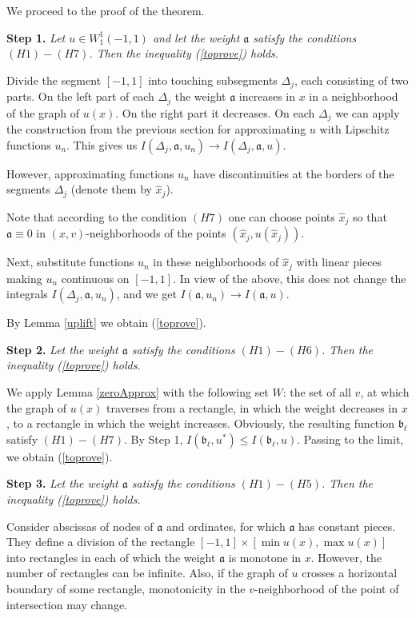 \documentclass[12pt]{article}
\renewcommand{\le}{\leqslant}
\newcommand{\W}{W_1^1}
\begin{document}
We proceed to the proof of the theorem.

\bigskip
{\bf Step 1.} {\it Let $u \in \W(-1, 1)$ and let the weight $\mathfrak a$ satisfy the conditions $(H1)-(H7)$.
Then the inequality (\ref{toprove}) holds.}

Divide the segment $[-1, 1]$ into touching subsegments $\Delta_j$, each consisting of two parts.
On the left part of each $\Delta_j$ the weight $\mathfrak a$ increases in $x$ in a neighborhood
of the graph of $u(x)$. On the right part it decreases.
On each $\Delta_j$ we can apply the construction from the previous section
for approximating $u$ with Lipschitz functions $u_n$.
This gives us $I(\Delta_j, \mathfrak a, u_n) \to I(\Delta_j, \mathfrak a, u)$.

However, approximating functions $u_n$ have discontinuities at the borders of the segments $\Delta_j$
(denote them by $\hat{x}_j$).

Note that according to the condition $(H7)$ one can choose points $\hat{x}_j$ so
that $\mathfrak a \equiv 0$ in $(x, v)$-neighborhoods of the points $(\hat{x}_j, u(\hat{x}_j))$.

Next, substitute functions $u_n$ in these neighborhoods of $\hat{x}_j$ with linear pieces
making $u_n$ continuous on $[-1, 1]$.
In view of the above, this does not change the integrals $I(\Delta_j, \mathfrak a, u_n)$,
and we get $I(\mathfrak a, u_n) \to I(\mathfrak a, u)$.

By Lemma \ref{uplift} we obtain (\ref{toprove}).

\bigskip

{\bf Step 2.} {\it Let the weight $\mathfrak a$ satisfy the conditions $(H1)-(H6)$.
Then the inequality (\ref{toprove}) holds.}

We apply Lemma \ref{zeroApprox} with the following set $W$:
the set of all $v$, at which the graph of $u(x)$ traverses from a rectangle,
in which the weight decreases in $x$,
to a rectangle in which the weight increases.
Obviously, the resulting function $\mathfrak b_{\ell}$ satisfy $(H1)-(H7)$.
By Step 1, $I(\mathfrak b_{\ell}, u^*) \le I(\mathfrak b_{\ell}, u)$.
Passing to the limit, we obtain (\ref{toprove}).

\bigskip

{\bf Step 3.} {\it Let the weight $\mathfrak a$ satisfy the conditions $(H1)-(H5)$.
Then the inequality (\ref{toprove}) holds.}

Consider abscissas of nodes of $\mathfrak a$
and ordinates, for which $\mathfrak a$ has constant pieces.
They define a division of the rectangle $[-1, 1] \times [\min u(x), \max u(x)]$
into rectangles in each of which the weight $\mathfrak a$ is monotone in $x$.
However, the number of rectangles can be infinite.
Also, if the graph of $u$ crosses a horizontal boundary of some rectangle,
monotonicity in the $v$-neighborhood of the point of intersection may change.
\end{document}
